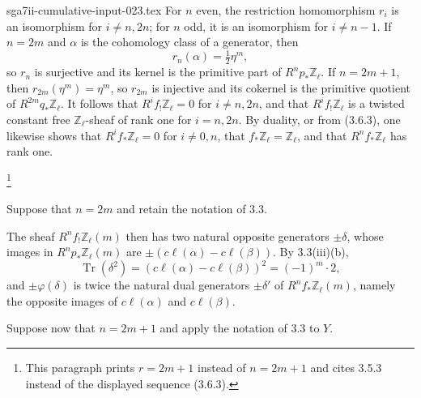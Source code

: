 \begin{filecontents*}{sga7ii-cumulative-input-023.tex}
For $n$ even, the restriction homomorphism $r_i$ is an isomorphism for
$i\neq n,2n$; for $n$ odd, it is an isomorphism for $i\neq n-1$.  If
$n=2m$ and $\alpha$ is the cohomology class of a generator, then
\begin{equation*}
r_n(\alpha)=\tfrac12\eta^m,
\end{equation*}
so $r_n$ is surjective and its kernel is the primitive part of
$R^np_*\mathbb Z_\ell$.  If $n=2m+1$, then
$r_{2m}(\eta^m)=\eta^m$, so $r_{2m}$ is injective and its cokernel is the
primitive quotient of $R^{2m}q_*\mathbb Z_\ell$.  It follows that
$R^if_!\mathbb Z_\ell=0$ for $i\neq n,2n$, and that
$R^if_!\mathbb Z_\ell$ is a twisted constant free
$\mathbb Z_\ell$-sheaf of rank one for $i=n,2n$.  By duality, or from
(3.6.3), one likewise shows that $R^if_*\mathbb Z_\ell=0$ for
$i\neq0,n$, that $f_*\mathbb Z_\ell=\mathbb Z_\ell$, and that
$R^nf_*\mathbb Z_\ell$ has rank one.

\footnote{This paragraph prints $r=2m+1$ instead of $n=2m+1$ and cites
3.5.3 instead of the displayed sequence (3.6.3).}

Suppose that $n=2m$ and retain the notation of 3.3.


\begin{center}
\end{center}

The sheaf $R^nf_!\mathbb Z_\ell(m)$ then has two natural opposite
generators $\pm\delta$, whose images in
$R^np_*\mathbb Z_\ell(m)$ are
$\pm(c\ell(\alpha)-c\ell(\beta))$.  By 3.3(iii)(b),
\begin{equation*}
\operatorname{Tr}(\delta^2)
=(c\ell(\alpha)-c\ell(\beta))^2=(-1)^m\cdot2,
\end{equation*}
and $\pm\varphi(\delta)$ is twice the natural dual generators
$\pm\delta'$ of $R^nf_*\mathbb Z_\ell(m)$, namely the opposite images
of $c\ell(\alpha)$ and $c\ell(\beta)$.

Suppose now that $n=2m+1$ and apply the notation of 3.3 to $Y$.


\end{filecontents*}
